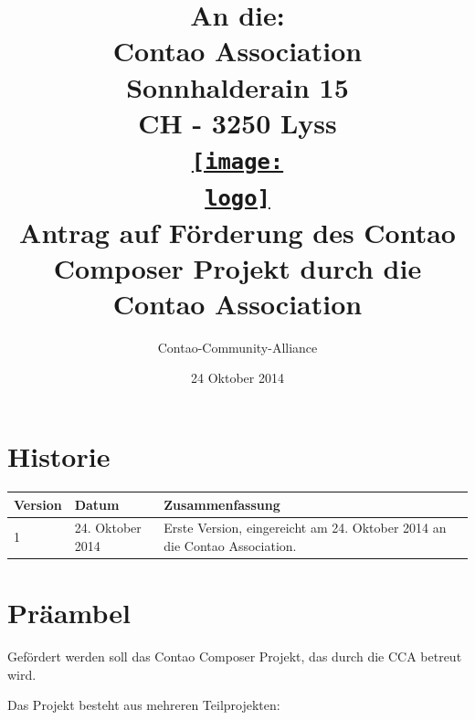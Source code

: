 \documentclass[
paper=a4,
draft=false,%
fontsize=10pt%
]{scrartcl}
\def\logo{logos/colorlogo_rgb}%
\begin{document}
\title{%
An die:\\
Contao Association\\
Sonnhalderain 15\\
CH - 3250 Lyss\\
\href{http://c-c-a.org}{\texttt{[image: \\logo]}}\\
Antrag auf Förderung des Contao Composer Projekt durch die Contao Association\\%
}
\date{24 Oktober 2014}
\author{Contao-Community-Alliance}
\maketitle

\pagebreak

%
%

\section*{Historie}

\begin{tabular*}{\textwidth}{@{\extracolsep{\fill} }llp{}}
\textbf{Version} & \textbf{Datum} & \textbf{Zusammenfassung} \\
\hline
1 & 24. Oktober 2014 & Erste Version, eingereicht am 24. Oktober 2014 an die Contao Association.
\end{tabular*}

\pagebreak

%
%

\section*{Präambel}

Gefördert werden soll das Contao Composer Projekt, das durch die CCA betreut wird.

Das Projekt besteht aus mehreren Teilprojekten:
\end{document}
